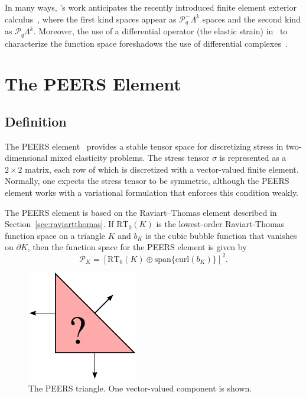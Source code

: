 In many ways, \nedelec{}'s work anticipates the recently introduced
finite element exterior calculus~\cite{ArnoldFalkEtAl2006}, where the
first kind spaces appear as \( \mathcal{P}_q^-\Lambda^k \) spaces and
the second kind as \(
\mathcal{P}_q\Lambda^k \). Moreover, the use of a differential
operator (the elastic strain) in~\cite{Nedelec1980} to characterize
the function space foreshadows the use of differential
complexes~\cite{ArnoldFalkEtAl2006a}.


\newpage

\section{The PEERS Element}

\subsection{Definition}

The PEERS element~\cite{ArnoldBrezziEtAl1984} provides a stable tensor
space for discretizing stress in two-dimensional mixed elasticity
problems. The stress tensor \( \sigma \) is represented as a \( 2
\times 2 \) matrix, each row of which is discretized with a
vector-valued finite element.  Normally, one expects the stress tensor
to be symmetric, although the PEERS element works with a variational
formulation that enforces this condition weakly.

The PEERS element is based on the Raviart--Thomas element described in
Section~\ref{sec:raviartthomas}.  If \( \mathrm{RT}_0(K) \) is the
lowest-order Raviart-Thomas function space on a triangle \( K \) and
\( b_K \) is the cubic bubble function that vanishes on \( \partial K
\), then the function space for the PEERS element is given by
\begin{displaymath}
\mathcal{P}_K = \left[\mathrm{RT}_0(K) \oplus \mathrm{span}\{\mathrm{curl}( b_K )\} \right]^2.
\end{displaymath}

\begin{figure}[h]
  \begin{center}
    \includegraphics[width=\smallfig]{chapters/kirby-6/pdf/PEERS.pdf}
    \caption{The PEERS triangle. One vector-valued component is shown.}
  \end{center}
\end{figure}

